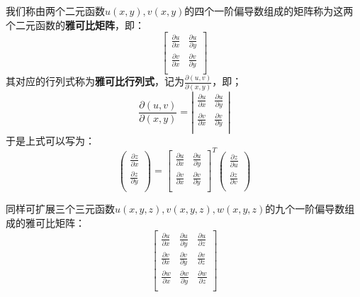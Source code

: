 \begin{definition}
我们称由两个二元函数$u\left( x,y \right) ,v\left( x,y \right) $的四个一阶偏导数组成的矩阵称为这两个二元函数的{\bf 雅可比矩阵}，即：
\[
\left[ \begin{matrix}
	\frac{\partial u}{\partial x}&		\frac{\partial u}{\partial y}\\
	\frac{\partial v}{\partial x}&		\frac{\partial v}{\partial y}\\
\end{matrix} \right]
\]
其对应的行列式称为{\bf 雅可比行列式}，记为$\frac{\partial \left( u,v \right)}{\partial \left( x,y \right)}$，即；
\[
\frac{\partial \left( u,v \right)}{\partial \left( x,y \right)}=\left| \begin{matrix}
	\frac{\partial u}{\partial x}&		\frac{\partial u}{\partial y}\\
	\frac{\partial v}{\partial x}&		\frac{\partial v}{\partial y}\\
\end{matrix} \right|
\]
于是上式可以写为：
\[
\left( \begin{array}{c}
	\frac{\partial z}{\partial x}\\
	\frac{\partial z}{\partial y}\\
\end{array} \right) =\left[ \begin{matrix}
	\frac{\partial u}{\partial x}&		\frac{\partial u}{\partial y}\\
	\frac{\partial v}{\partial x}&		\frac{\partial v}{\partial y}\\
\end{matrix} \right] ^T\left( \begin{array}{c}
	\frac{\partial z}{\partial u}\\
	\frac{\partial z}{\partial v}\\
\end{array} \right)
\]
\end{definition}

同样可扩展三个三元函数$u\left( x,y,z \right) ,v\left( x,y,z \right) ,w\left( x,y,z \right) $的九个一阶偏导数组成的雅可比矩阵：
\[
\left[ \begin{matrix}
	\frac{\partial u}{\partial x}&		\frac{\partial u}{\partial y}&		\frac{\partial u}{\partial z}\\
	\frac{\partial v}{\partial x}&		\frac{\partial v}{\partial y}&		\frac{\partial v}{\partial z}\\
	\frac{\partial w}{\partial x}&		\frac{\partial w}{\partial y}&		\frac{\partial w}{\partial z}\\
\end{matrix} \right]
\]

